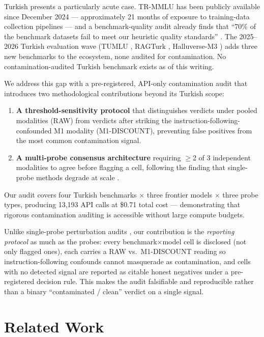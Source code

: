 \documentclass[11pt]{article}
\begin{document}
Turkish presents a particularly acute case. TR-MMLU \cite{trmmu2024} has been publicly available since December 2024 --- approximately 21 months of exposure to training-data collection pipelines --- and a benchmark-quality audit already finds that ``70\% of the benchmark datasets fail to meet our heuristic quality standards'' \cite{yildiz2025evaluating}. The 2025--2026 Turkish evaluation wave (TUMLU \cite{tumlu2025}, RAGTurk \cite{ragturk2026}, Halluverse-M3 \cite{halluverse2026}) adds three new benchmarks to the ecosystem, none audited for contamination. No contamination-audited Turkish benchmark exists as of this writing.

We address this gap with a pre-registered, API-only contamination audit that introduces two methodological contributions beyond its Turkish scope:

\begin{enumerate}
\item \textbf{A threshold-sensitivity protocol} that distinguishes verdicts under pooled modalities (RAW) from verdicts after striking the instruction-following-confounded M1 modality (M1-DISCOUNT), preventing false positives from the most common contamination signal.
\item \textbf{A multi-probe consensus architecture} requiring $\geq$2 of 3 independent modalities to agree before flagging a cell, following the finding that single-probe methods degrade at scale \cite{contamdetect2024}.
\end{enumerate}

Our audit covers four Turkish benchmarks $\times$ three frontier models $\times$ three probe types, producing 13,193 API calls at \$0.71 total cost --- demonstrating that rigorous contamination auditing is accessible without large compute budgets.

Unlike single-probe perturbation audits \cite{sanchz2025mcq,fragilereasoning2025,contamdetect2024}, our contribution is the \emph{reporting protocol} as much as the probes: every benchmark$\times$model cell is disclosed (not only flagged ones), each carries a RAW vs.\ M1-DISCOUNT reading so instruction-following confounds cannot masquerade as contamination, and cells with no detected signal are reported as citable honest negatives under a pre-registered decision rule. This makes the audit falsifiable and reproducible rather than a binary ``contaminated / clean'' verdict on a single signal.

\section{Related Work}
\end{document}
